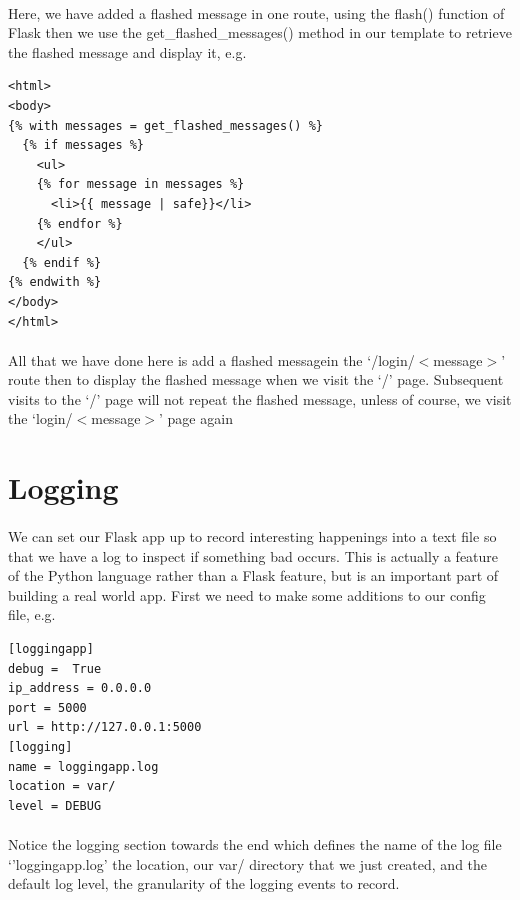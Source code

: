 \documentclass[12pt, a4paper, twoside]{book}
\begin{document}
\paragraph{} Here, we have added a flashed message in one route, using the flash() function of Flask then we use the get\_flashed\_messages() method in our template to retrieve the flashed message and display it, e.g.

\begin{lstlisting}
<html>
<body>
{% with messages = get_flashed_messages() %}
  {% if messages %}
    <ul>
    {% for message in messages %}
      <li>{{ message | safe}}</li>
    {% endfor %}
    </ul>
  {% endif %}
{% endwith %}
</body>
</html>
\end{lstlisting}

\paragraph{} All that we have done here is add a flashed messagein the `/login/$<$message$>$' route then to display the flashed message when we visit the `/' page. Subsequent visits to the `/' page will not repeat the flashed message, unless of course, we visit the `login/$<$message$>$' page again

\section{Logging}
\label{logging}
\paragraph{} We can set our Flask app up to record interesting happenings into a text file so that we have a log to inspect if something bad occurs. This is actually a feature of the Python language rather than a Flask feature, but is an important part of building a real world app. First we need to make some additions to our config file, e.g.

\begin{lstlisting}
[loggingapp]
debug =  True
ip_address = 0.0.0.0
port = 5000
url = http://127.0.0.1:5000
[logging]
name = loggingapp.log
location = var/
level = DEBUG
\end{lstlisting}
\paragraph{} Notice the logging section towards the end which defines the name of the log file `'loggingapp.log' the location, our var/ directory that we just created, and the default log level, the granularity of the logging events to record. 
\end{document}
